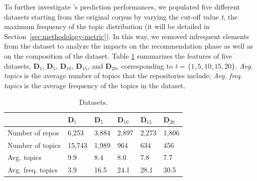 To further investigate \TF's prediction performances, we populated five different datasets starting from the original corpus by varying the cut-off value \emph{t}, \ie the maximum frequency of the topic distribution (it will be detailed in Section~\ref{sec:methodology-metric}). In this way, we removed infrequent elements from the dataset to analyze the impacts on the recommendation phase as well as on the composition of the dataset. Table \ref{tab:Datasets} summarizes the features of five datasets, \ie \textbf{D$_1$}, \textbf{D$_5$}, \textbf{D$_{10}$}, \textbf{D$_{15}$}, and \textbf{D$_{20}$}, corresponding to \emph{t} = $\{1, 5, 10, 15, 20\}$. \emph{Avg. topics} is the average number of topics that the repositories include; \emph{Avg. freq. topics} is the average frequency of the topics in the dataset.%


%


\begin{table}[h!]
	\caption{Datasets.}
	\begin{tabular}{|l|p{0.68cm}|p{0.68cm}|p{0.68cm}|p{0.68cm}|p{0.68cm}|} \hline
		 & \textbf{ D$_{1}$} & \textbf{D$_{5}$} & \textbf{ D$_{10}$} & \textbf{D$_{15}$} & \textbf{D$_{20}$} \\ \hline
		Number of repos & 6,253 & 3,884 & 2,897  & 2,273 & 1,806  \\ \hline
		Number of topics & 15,743 & 1,989 & 964 & 634 & 456 \\ \hline
		Avg. topics & 9.9 & 8.4 & 8.0  & 7.8 & 7.7 \\ \hline
		Avg. freq. topics & 3.9  & 16.5  & 24.1  & 28.1  & 30.5  \\ \hline
	\end{tabular}	
	\label{tab:Datasets}	
\end{table}



